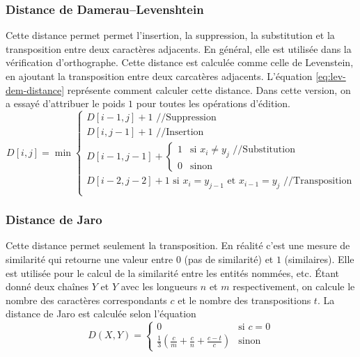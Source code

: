 \documentclass{KodeBook}
\begin{document}
\subsubsection{Distance de Damerau–Levenshtein}

Cette distance permet permet l'insertion, la suppression, la substitution et la transposition entre deux caractères adjacents.
En général, elle est utilisée dans la vérification d'orthographe.
Cette distance est calculée comme celle de Levenstein, en ajoutant la transposition entre deux carcatères adjacents.
L'équation \ref{eq:lev-dem-distance} représente comment calculer cette distance.
Dans cette version, on a essayé d'attribuer le poids $1$ pour toutes les opérations d'édition.
\begin{equation}
D[i, j] = \min 
	\begin{cases}
		D[i - 1, j] + 1 \text{ //Suppression}\\
		D[i, j-1] + 1 \text{ //Insertion}\\
		D[i-1, j-1] + \begin{cases}
			1 & \text{si } x_i \ne y_j \text{ //Substitution}\\
			0 & \text{sinon}
		\end{cases}\\
		D[i-2, j-2] + 1 \text{ si } x_i = y_{j-1} \text{ et } x_{i-1} = y_j \text{ //Transposition}\\
	\end{cases}
	\label{eq:lev-dem-distance}
\end{equation}

\subsubsection{Distance de Jaro}

Cette distance permet seulement la transposition.
En réalité c'est une mesure de similarité qui retourne une valeur entre $0$ (pas de similarité) et $1$ (similaires). 
Elle est utilisée pour le calcul de la similarité entre les entités nommées, etc.
Étant donné deux chaînes $Y$ et $Y$ avec les longueurs $n$ et $m$ respectivement, on calcule le nombre des caractères correspondants $c$ et le nombre des transpositions $t$. 
La distance de Jaro est calculée selon l'équation 
\begin{equation}
	D(X, Y) = 
	\begin{cases}
	0 & \text{si } c = 0\\
	\frac{1}{3} (\frac{c}{m} + \frac{c}{n} + \frac{c-t}{c}) & \text{sinon}
	\end{cases}
	\label{eq:jaro-distance}
\end{equation}
\end{document}
